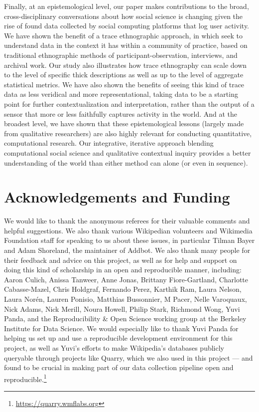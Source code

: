 \documentclass[format=acmsmall, review=false, screen=true]{acmart}%
\begin{document}
Finally, at an epistemological level, our paper makes contributions to the broad, cross-disciplinary conversations about how social science is changing given the rise of found data collected by social computing platforms that log user activity. We have shown the benefit of a trace ethnographic approach, in which seek to understand data in the context it has within a community of practice, based on traditional ethnographic methods of participant-observation, interviews, and archival work. Our study also illustrates how trace ethnography can scale down to the level of specific thick descriptions as well as up to the level of aggregate statistical metrics. We have also shown the benefits of seeing this kind of trace data as less veridical and more representational, taking data to be a starting point for further contextualization and interpretation, rather than the output of a sensor that more or less faithfully captures activity in the world. And at the broadest level, we have shown that these epistemological lessons (largely made from qualitative researchers) are also highly relevant for conducting quantitative, computational research. Our integrative, iterative approach blending computational social science and qualitative contextual inquiry provides a better understanding of the world than either method can alone (or even in sequence).

\section*{Acknowledgements and Funding}
We would like to thank the anonymous referees for their valuable comments and helpful suggestions. We also thank various Wikipedian volunteers and Wikimedia Foundation staff for speaking to us about these issues, in particular Tilman Bayer and Adam Shoreland, the maintainer of Addbot. We also thank many people for their feedback and advice on this project, as well as for help and support on doing this kind of scholarship in an open and reproducible manner, including: Aaron Culich, Anissa Tanweer, Anne Jonas, Brittany Fiore-Gartland, Charlotte Cabasse-Mazel, Chris Holdgraf, Fernando Perez, Karthik Ram, Laura Nelson, Laura Nor\'{e}n, Lauren Ponisio, Matthias Bussonnier, M Pacer, Nelle Varoquaux, Nick Adams, Nick Merill, Noura Howell, Philip Stark, Richmond Wong, Yuvi Panda, and the Reproducibility \& Open Science working group at the Berkeley Institute for Data Science. We would especially like to thank Yuvi Panda for helping us set up and use a reproducible development environment for this project, as well as Yuvi's efforts to make Wikipedia's databases publicly queryable through projects like Quarry, which we also used in this project --- and found to be crucial in making part of our data collection pipeline open and reproducible.\footnote{ \url{https://quarry.wmflabs.org}}
\end{document}
